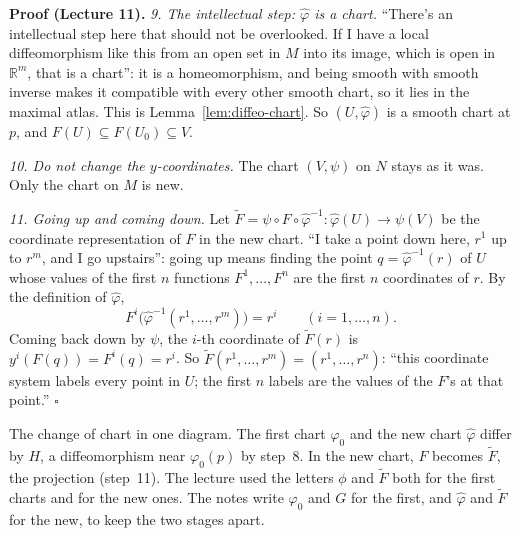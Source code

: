 \documentclass[11pt]{report}
\renewenvironment{proof}[1][Proof]{\noindent\textbf{#1.} }{\hfill$\square$\par\vspace{5pt}}
\begin{document}
\begin{proof}[Proof (Lecture 11)]
\emph{9. The intellectual step: $\hat\varphi$ is a chart.} ``There's an intellectual step here that should not be overlooked. If I have a local diffeomorphism like this from an open set in $M$ into its image, which is open in $\mathbb{R}^m$, that is a chart'': it is a homeomorphism, and being smooth with smooth inverse makes it compatible with every other smooth chart, so it lies in the maximal atlas. This is Lemma~\ref{lem:diffeo-chart}. So $(U, \hat\varphi)$ is a smooth chart at $p$, and $F(U) \subseteq F(U_0) \subseteq V$.

\emph{10. Do not change the $y$-coordinates.} The chart $(V, \psi)$ on $N$ stays as it was. Only the chart on $M$ is new.

\emph{11. Going up and coming down.} Let $\tilde F = \psi \circ F \circ \hat\varphi^{-1} : \hat\varphi(U) \to \psi(V)$ be the coordinate representation of $F$ in the new chart. ``I take a point down here, $r^1$ up to $r^m$, and I go upstairs'': going up means finding the point $q = \hat\varphi^{-1}(r)$ of $U$ whose values of the first $n$ functions $F^1, \ldots, F^n$ are the first $n$ coordinates of $r$. By the definition of $\hat\varphi$,
\[
F^i\big(\hat\varphi^{-1}(r^1, \ldots, r^m)\big) = r^i \qquad (i = 1, \ldots, n).
\]
Coming back down by $\psi$, the $i$-th coordinate of $\tilde F(r)$ is $y^i(F(q)) = F^i(q) = r^i$. So $\tilde F(r^1, \ldots, r^m) = (r^1, \ldots, r^n)$: ``this coordinate system labels every point in $U$; the first $n$ labels are the values of the $F$'s at that point.''
\end{proof}

\begin{center}
\end{center}

The change of chart in one diagram. The first chart $\varphi_0$ and the new chart $\hat\varphi$ differ by $H$, a diffeomorphism near $\varphi_0(p)$ by step~8. In the new chart, $F$ becomes $\tilde F$, the projection (step~11). The lecture used the letters $\phi$ and $\tilde F$ both for the first charts and for the new ones. The notes write $\varphi_0$ and $G$ for the first, and $\hat\varphi$ and $\tilde F$ for the new, to keep the two stages apart.
\end{document}
